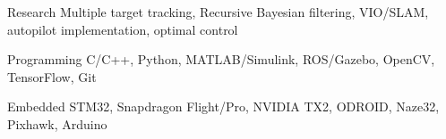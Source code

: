 

\begin{cvskills}

  \cvskill
    {Research} %
    {Multiple target tracking, Recursive Bayesian filtering, VIO/SLAM, autopilot implementation, optimal control} %

  \cvskill
    {Programming} %
    {C/C++, Python, MATLAB/Simulink, ROS/Gazebo, OpenCV, TensorFlow, Git} %

  \cvskill
    {Embedded} %
    {STM32, Snapdragon Flight/Pro, NVIDIA TX2, ODROID, Naze32, Pixhawk, Arduino} %

\end{cvskills}
